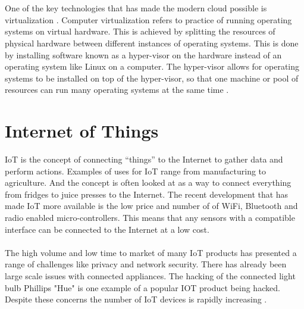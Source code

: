 \documentclass[]{uiophd}
\begin{document}
\cite{}

\\\\
One of the key technologies that has made the modern cloud possible is virtualization \cite{virt}. Computer virtualization refers to practice of running operating systems on virtual hardware. This is achieved by splitting the resources of physical hardware between different instances of operating systems. This is done by installing software known as a hyper-visor on the hardware instead of an operating system like Linux on a computer. The hyper-visor allows for operating systems to be installed on top of the hyper-visor, so that one machine or pool of resources can run many operating systems at the same time \cite{1430631}.


\section{Internet of Things}
IoT is the concept of connecting “things” to the Internet to gather data and perform actions. Examples of uses for IoT range from manufacturing to agriculture. And the concept is often looked at as a way to connect everything from fridges to juice presses to the Internet. The recent development that has made IoT more available is the low price and number of of WiFi, Bluetooth and radio enabled micro-controllers. This means that any sensors with a compatible interface can be connected to the Internet at a low cost.
\\\\
The high volume and low time to market of many IoT products has presented a range of challenges like privacy and network security. There has already been large scale issues with connected appliances. The hacking of the connected light bulb Phillips "Hue" \cite{6997469} is one example of a popular IOT product being hacked. Despite these concerns the number of IoT devices is rapidly increasing \cite{ericsson}.
\end{document}

